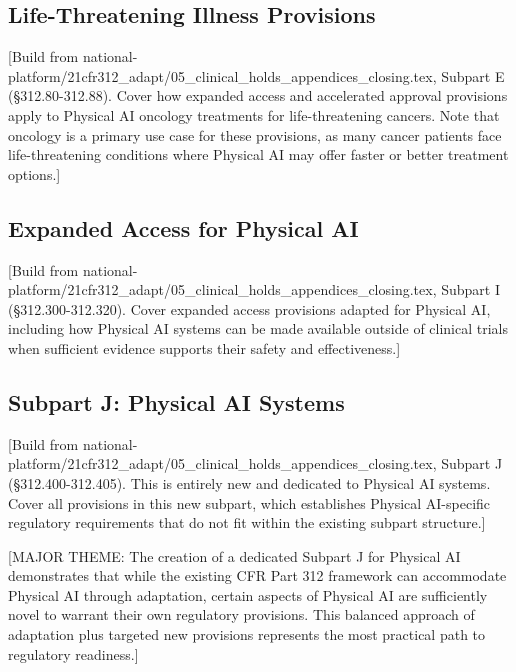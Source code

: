 \subsection{Life-Threatening Illness Provisions}
\label{subsec:cfr312-life-threatening}

[Build from national-platform/21cfr312\_adapt/05\_clinical\_holds\_appendices\_closing.tex,
Subpart E (\S 312.80-312.88). Cover how expanded access and accelerated
approval provisions apply to Physical AI oncology treatments for
life-threatening cancers. Note that oncology is a primary use case for these
provisions, as many cancer patients face life-threatening conditions where
Physical AI may offer faster or better treatment options.]

\subsection{Expanded Access for Physical AI}
\label{subsec:cfr312-expanded-access}

[Build from national-platform/21cfr312\_adapt/05\_clinical\_holds\_appendices\_closing.tex,
Subpart I (\S 312.300-312.320). Cover expanded access provisions adapted for
Physical AI, including how Physical AI systems can be made available outside
of clinical trials when sufficient evidence supports their safety and
effectiveness.]

\subsection{Subpart J: Physical AI Systems}
\label{subsec:cfr312-subpart-j}

[Build from national-platform/21cfr312\_adapt/05\_clinical\_holds\_appendices\_closing.tex,
Subpart J (\S 312.400-312.405). This is entirely new and dedicated to Physical
AI systems. Cover all provisions in this new subpart, which establishes
Physical AI-specific regulatory requirements that do not fit within the
existing subpart structure.]

[MAJOR THEME: The creation of a dedicated Subpart J for Physical AI demonstrates
that while the existing CFR Part 312 framework can accommodate Physical AI
through adaptation, certain aspects of Physical AI are sufficiently novel to
warrant their own regulatory provisions. This balanced approach of adaptation
plus targeted new provisions represents the most practical path to regulatory
readiness.]

